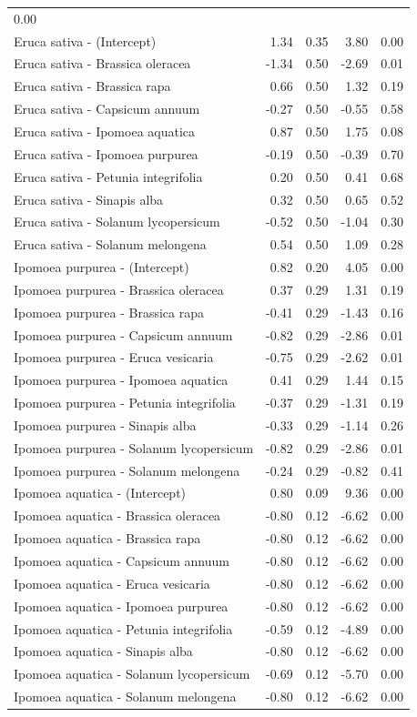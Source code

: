 \documentclass[
  12pt,
]{article}
\begin{document}
\begin{longtable}[]{@{}lrrrr@{}}
0.00\tabularnewline
Eruca sativa - (Intercept) & 1.34 & 0.35 & 3.80 & 0.00\tabularnewline
Eruca sativa - Brassica oleracea & -1.34 & 0.50 & -2.69 &
0.01\tabularnewline
Eruca sativa - Brassica rapa & 0.66 & 0.50 & 1.32 & 0.19\tabularnewline
Eruca sativa - Capsicum annuum & -0.27 & 0.50 & -0.55 &
0.58\tabularnewline
Eruca sativa - Ipomoea aquatica & 0.87 & 0.50 & 1.75 &
0.08\tabularnewline
Eruca sativa - Ipomoea purpurea & -0.19 & 0.50 & -0.39 &
0.70\tabularnewline
Eruca sativa - Petunia integrifolia & 0.20 & 0.50 & 0.41 &
0.68\tabularnewline
Eruca sativa - Sinapis alba & 0.32 & 0.50 & 0.65 & 0.52\tabularnewline
Eruca sativa - Solanum lycopersicum & -0.52 & 0.50 & -1.04 &
0.30\tabularnewline
Eruca sativa - Solanum melongena & 0.54 & 0.50 & 1.09 &
0.28\tabularnewline
Ipomoea purpurea - (Intercept) & 0.82 & 0.20 & 4.05 &
0.00\tabularnewline
Ipomoea purpurea - Brassica oleracea & 0.37 & 0.29 & 1.31 &
0.19\tabularnewline
Ipomoea purpurea - Brassica rapa & -0.41 & 0.29 & -1.43 &
0.16\tabularnewline
Ipomoea purpurea - Capsicum annuum & -0.82 & 0.29 & -2.86 &
0.01\tabularnewline
Ipomoea purpurea - Eruca vesicaria & -0.75 & 0.29 & -2.62 &
0.01\tabularnewline
Ipomoea purpurea - Ipomoea aquatica & 0.41 & 0.29 & 1.44 &
0.15\tabularnewline
Ipomoea purpurea - Petunia integrifolia & -0.37 & 0.29 & -1.31 &
0.19\tabularnewline
Ipomoea purpurea - Sinapis alba & -0.33 & 0.29 & -1.14 &
0.26\tabularnewline
Ipomoea purpurea - Solanum lycopersicum & -0.82 & 0.29 & -2.86 &
0.01\tabularnewline
Ipomoea purpurea - Solanum melongena & -0.24 & 0.29 & -0.82 &
0.41\tabularnewline
Ipomoea aquatica - (Intercept) & 0.80 & 0.09 & 9.36 &
0.00\tabularnewline
Ipomoea aquatica - Brassica oleracea & -0.80 & 0.12 & -6.62 &
0.00\tabularnewline
Ipomoea aquatica - Brassica rapa & -0.80 & 0.12 & -6.62 &
0.00\tabularnewline
Ipomoea aquatica - Capsicum annuum & -0.80 & 0.12 & -6.62 &
0.00\tabularnewline
Ipomoea aquatica - Eruca vesicaria & -0.80 & 0.12 & -6.62 &
0.00\tabularnewline
Ipomoea aquatica - Ipomoea purpurea & -0.80 & 0.12 & -6.62 &
0.00\tabularnewline
Ipomoea aquatica - Petunia integrifolia & -0.59 & 0.12 & -4.89 &
0.00\tabularnewline
Ipomoea aquatica - Sinapis alba & -0.80 & 0.12 & -6.62 &
0.00\tabularnewline
Ipomoea aquatica - Solanum lycopersicum & -0.69 & 0.12 & -5.70 &
0.00\tabularnewline
Ipomoea aquatica - Solanum melongena & -0.80 & 0.12 & -6.62 &
0.00\tabularnewline
\bottomrule
\end{longtable}

\newpage
\end{document}
